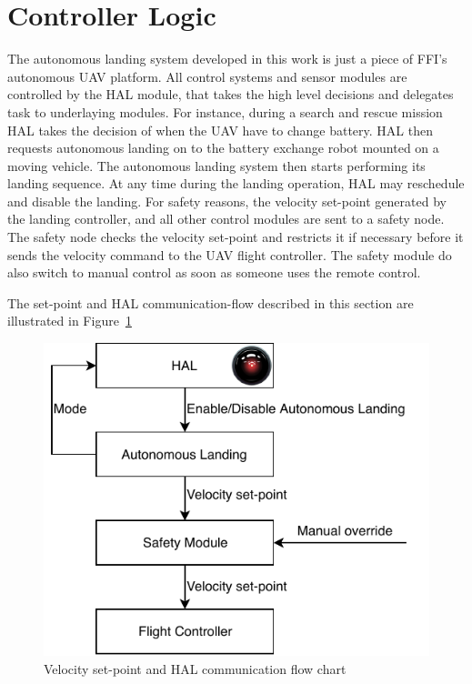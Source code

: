 
\section{Controller Logic} %
\label{sec:controller_logic}
The autonomous landing system developed in this work is just a piece of FFI's autonomous UAV platform. All control systems and sensor modules are controlled by the \gls{HAL} module, that takes the high level decisions and delegates task to underlaying modules. For instance, during a search and rescue mission HAL takes the decision of when the UAV have to change battery. HAL then requests autonomous landing on to the battery exchange robot mounted on a moving vehicle. The autonomous landing system then starts performing its landing sequence. At any time during the landing operation, HAL may reschedule and disable the landing. 
For safety reasons, the velocity set-point generated by the landing controller, and all other control modules are sent to a safety node. The safety node checks the velocity set-point and restricts it if necessary before it sends the velocity command to the UAV flight controller. The safety module do also switch to manual control as soon as someone uses the remote control. 

The set-point and HAL communication-flow described in this section are illustrated in Figure~\ref{fig:sp_flow}
\begin{figure}[ht]
	\begin{center}
		\includegraphics[scale=1.0]{img/sp_flow}
        \caption{Velocity set-point and HAL communication flow chart}
        \label{fig:sp_flow}
	\end{center}
\end{figure}


